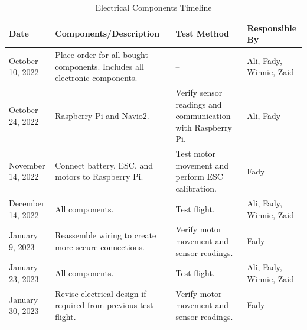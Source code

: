 \documentclass[12pt, titlepage]{article}
\begin{document}
\begin{table}[!h]
\begin{center}
\caption {Electrical Components Timeline}
\label{tab:elecTimeline}
\begin{tabular}{ | m{2.5cm} | m{7.5cm} | m{3cm} | m{2cm} | } 
\hline
Date & Components/Description & Test Method & Responsible By \\
\hline
October 10, 2022 & Place order for all bought components. Includes all electronic components. & 
    -- & Ali, Fady, Winnie, Zaid \\
\hline
October 24, 2022 & Raspberry Pi and Navio2. & 
    Verify sensor readings and communication with Raspberry Pi. & Ali, Fady \\
\hline
November 14, 2022 & Connect battery, ESC, and motors to Raspberry Pi. & 
    Test motor movement and perform ESC calibration. & Fady \\
\hline
December 14, 2022 & All components. & 
    Test flight. & Ali, Fady, Winnie, Zaid \\
\hline
January 9, 2023 & Reassemble wiring to create more secure connections. & 
    Verify motor movement and sensor readings. & Fady \\
\hline
January 23, 2023 & All components. & 
    Test flight. & Ali, Fady, Winnie, Zaid \\
\hline
January 30, 2023 & Revise electrical design if required from previous test flight. & 
    Verify motor movement and sensor readings. & Fady \\
\hline
\end{tabular}
\end{center}
\end{table}
\end{document}
